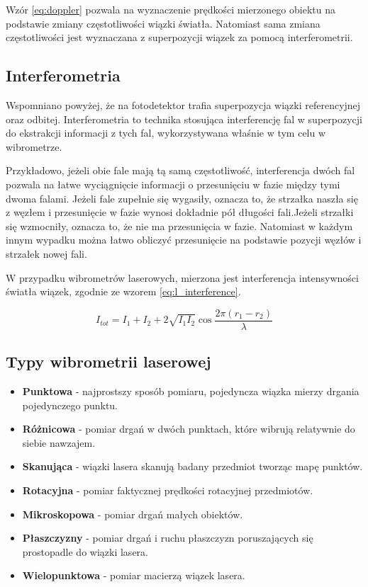 Wzór \ref{eq:doppler} pozwala na wyznaczenie prędkości mierzonego obiektu na podstawie zmiany częstotliwości wiązki światła. Natomiast sama zmiana częstotliwości jest wyznaczana z superpozycji wiązek za pomocą interferometrii.

\subsection{Interferometria}
Wspomniano powyżej, że na fotodetektor trafia superpozycja wiązki referencyjnej oraz odbitej. Interferometria to technika stosująca interferencję fal w superpozycji do ekstrakcji informacji z tych fal, wykorzystywana właśnie w tym celu w wibrometrze. \cite{history_of_science_and_tech}

Przykładowo, jeżeli obie fale mają tą samą częstotliwość, interferencja dwóch fal pozwala na łatwe wyciągnięcie informacji o przesunięciu w fazie między tymi dwoma falami. Jeżeli fale zupełnie się wygasiły, oznacza to, że strzałka naszła się z węzłem i przesunięcie w fazie wynosi dokładnie pół długości fali.Jeżeli strzałki się wzmocniły, oznacza to, że nie ma przesunięcia w fazie. Natomiast w każdym innym wypadku można łatwo obliczyć przesunięcie na podstawie pozycji węzłów i strzałek nowej fali. \cite{Two_laser_interferometry}

W przypadku wibrometrów laserowych, mierzona jest interferencja intensywności światła wiązek, zgodnie ze wzorem \ref{eq:l_interference}. \cite{Polytec_LDV}

\begin{equation} \label{eq:l_interference}
I_{tot} = I_1 + I_2 + 2 \sqrt{I_1 I_2} \cos{ \frac{2 \pi (r_1 - r_2)}{\lambda}}
\end{equation}


\subsection{Typy wibrometrii laserowej \cite{Polytec_LDV_typology}}
\begin{itemize}
    \item \textbf{Punktowa} - najprostszy sposób pomiaru, pojedyncza wiązka mierzy drgania pojedynczego punktu.
    \item \textbf{Różnicowa} - pomiar drgań w dwóch punktach, które wibrują relatywnie do siebie nawzajem.
    \item \textbf{Skanująca} - wiązki lasera skanują badany przedmiot tworząc mapę punktów.
    \item \textbf{Rotacyjna} - pomiar faktycznej prędkości rotacyjnej przedmiotów.
    \item \textbf{Mikroskopowa} - pomiar drgań małych obiektów.
    \item \textbf{Płaszczyzny} - pomiar drgań i ruchu płaszczyzn poruszających się prostopadle do wiązki lasera.
    \item \textbf{Wielopunktowa} - pomiar macierzą wiązek lasera.
\end{itemize}


